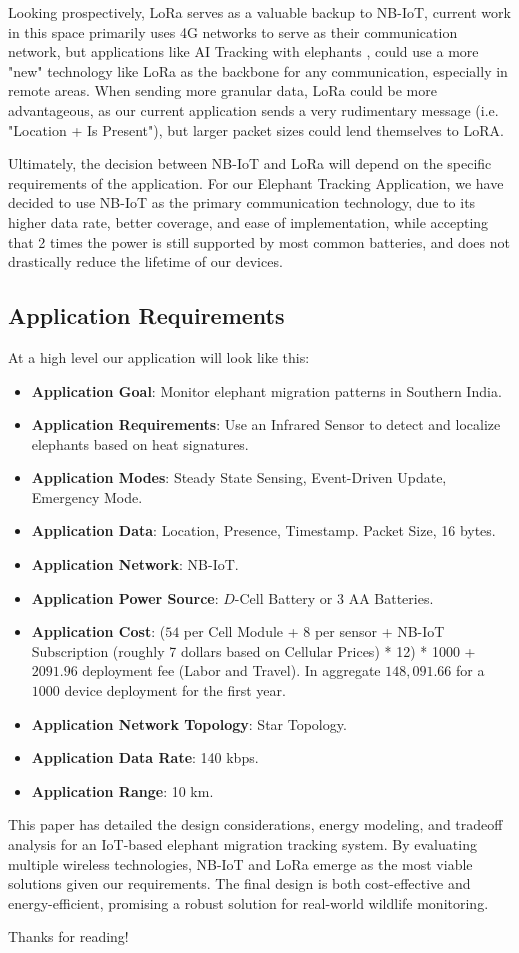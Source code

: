 Looking prospectively, LoRa serves as a valuable backup to NB-IoT, current work in this space primarily uses 4G networks to serve as their communication network, but applications like AI Tracking with elephants \cite{aielephant}, could use a more "new" technology like LoRa as the backbone for any communication, especially in remote areas. When sending more granular data, LoRa could be more advantageous, as our current application sends a very rudimentary message (i.e. "Location + Is Present"), but larger packet sizes could lend themselves to LoRA.


Ultimately, the decision between NB-IoT and LoRa will depend on the specific requirements of the application. For our Elephant Tracking Application, we have decided to use NB-IoT as the primary communication technology, due to its higher data rate, better coverage, and ease of implementation, while accepting that 2 times the power is still supported by most common batteries, and does not drastically reduce the lifetime of our devices. 

\subsection{Application Requirements}
At a high level our application will look like this:
\begin{itemize}
    \item \textbf{Application Goal}: Monitor elephant migration patterns in Southern India.
    \item \textbf{Application Requirements}: Use an Infrared Sensor to detect and localize elephants based on heat signatures.
    \item \textbf{Application Modes}: Steady State Sensing, Event-Driven Update, Emergency Mode.
    \item \textbf{Application Data}: Location, Presence, Timestamp. Packet Size, 16 bytes.
    \item \textbf{Application Network}: NB-IoT.
    \item \textbf{Application Power Source}: $D$-Cell Battery or 3 AA Batteries.
    \item \textbf{Application Cost}: ($54$ per Cell Module + $8$ per sensor + NB-IoT Subscription (roughly 7 dollars based on Cellular Prices) * 12) * 1000 + $2091.96$ deployment fee (Labor and Travel).  In aggregate $148,091.66$ for a $1000$ device deployment for the first year.
    \item \textbf{Application Network Topology}: Star Topology.
    \item \textbf{Application Data Rate}: 140 kbps.
    \item \textbf{Application Range}: 10 km.
\end{itemize}

This paper has detailed the design considerations, energy modeling, and tradeoff analysis for an IoT-based elephant migration tracking system. By evaluating multiple wireless technologies, NB-IoT and LoRa emerge as the most viable solutions given our requirements. The final design is both cost-effective and energy-efficient, promising a robust solution for real-world wildlife monitoring.

Thanks for reading!


